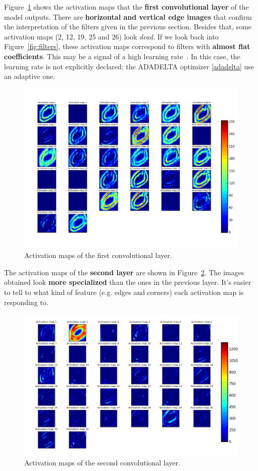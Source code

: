 Figure~\ref{fig:activation_maps} shows the activation maps that the \textbf{first convolutional layer} of the model outputs. There are \textbf{horizontal and vertical edge images} that confirm the interpretation of the filters given in the previous section. Besides that, some activation maps (2, 12, 19, 25 and 26) look \textit{dead}. If we look back into Figure~\ref{fig:filters}, these activation maps correspond to filters with \textbf{almost flat coefficients}. This may be a signal of a high learning rate~\cite{cs231n}. In this case, the learning rate is not explicitly declared: the ADADELTA optimizer \ref{adadelta} use an adaptive one.
\begin{figure}
	\centering
	\includegraphics[width=0.85\linewidth, keepaspectratio]{figures/activation_maps_conv2d_1.png}
	\caption{Activation maps of the first convolutional layer.}
	\label{fig:activation_maps}
\end{figure}

The activation maps of the \textbf{second layer} are shown in Figure~\ref{fig:activation_maps2}. The images obtained look \textbf{more specialized} than the ones in the previous layer. It's easier to tell to what kind of feature (e.g. edges and corners) each activation map is responding to.
\begin{figure}
	\centering
	\includegraphics[width=0.85\linewidth, keepaspectratio]{figures/activation_maps_conv2d_2.png}
	\caption{Activation maps of the second convolutional layer.}
	\label{fig:activation_maps2}
\end{figure}

